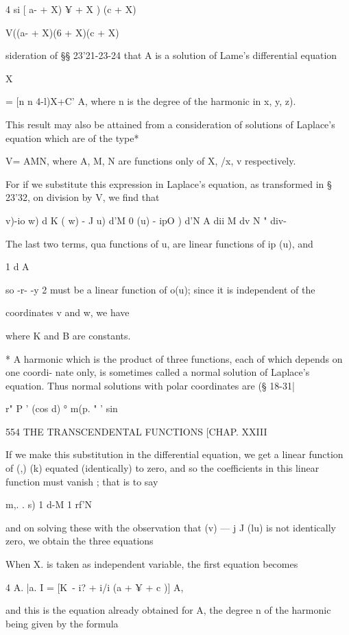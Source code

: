 {{{4 si [ a- + X) ¥ + X ) (c + X)



V((a- + X)(6 + X)(c + X)



sideration of §§ 23'21-23-24 that A is a solution of Lame's
differential equation

X

= [n n 4-l)X+C' A, where n is the degree of the harmonic in x, y, z).

This result may also be attained from a consideration of solutions of
Laplace's equation which are of the type*

V= AMN, where A, M, N are functions only of X, /x, v respectively.

For if we substitute this expression in Laplace's equation, as
transformed in § 23'32, on division by V, we find that

  v)-io w) d K ( w) - J u) d'M 0 (u) - ipO ) d'N A dii M dv N " div-

The last two terms, qua functions of u, are linear functions of ip
(u), and

1 d A

so -r- -y 2 must be a linear function of o(u); since it is independent
of the

coordinates v and w, we have

where K and B are constants.

* A harmonic which is the product of three functions, each of which
depends on one coordi- nate only, is sometimes called a normal
solution of Laplace's equation. Thus normal solutions with polar
coordinates are (§ 18-31|

r" P ' (cos d) ° m(p. " ' sin



554 THE TRANSCENDENTAL FUNCTIONS [CHAP. XXIII

If we make this substitution in the differential equation, we get a
linear function of (,) (k) equated (identically) to zero, and so the
coefficients in this linear function must vanish ; that is to say

m,. . s) 1 d-M 1 rf'N

and on solving these with the observation that (v) — j J (lu) is not
identically zero, we obtain the three equations

When X. is taken as independent variable, the first equation becomes

4 A. |a. I = [K\ - i? + i/i (a + ¥ + c )] A,

and this is the equation already obtained for A, the degree n of the
harmonic being given by the formula

}}}
